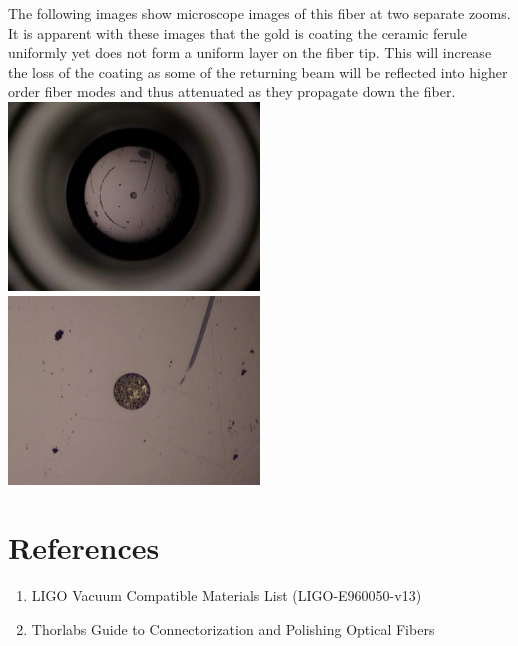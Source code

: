 \documentclass{article}
\begin{document}
The following images show microscope images of this fiber at two separate zooms. It is apparent with these images that the gold is coating the ceramic ferule uniformly yet does not form a uniform layer on the fiber tip. This will increase the loss of the coating as some of the returning beam will be reflected into higher order fiber modes and thus attenuated as they propagate down the fiber.\\

\includegraphics[width=0.5\textwidth]{GoldFiberTip.JPG}
\includegraphics[width=0.5\textwidth]{GoldFiberTipZoom.JPG}
\section{References}
\begin{enumerate}
\item LIGO Vacuum Compatible Materials List (LIGO-E960050-v13)
\item Thorlabs Guide to Connectorization and Polishing Optical Fibers 
\end{enumerate}
\end{document}
